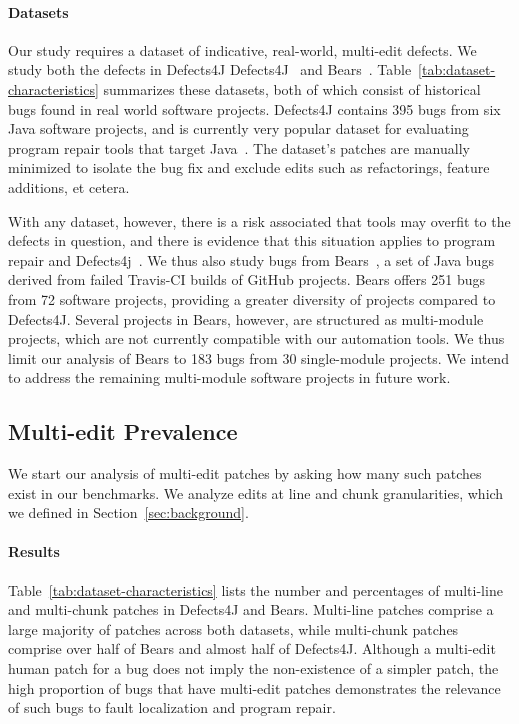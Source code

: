 \documentclass[sigconf, timestamp-false, anonymous=true]{acmart}
\begin{document}
\paragraph{Datasets}  Our study requires a dataset of indicative, real-world,
multi-edit defects.  We study both the defects in Defects4J
Defects4J~\cite{defects4j} and Bears~\cite{bears}.  Table~\ref{tab:dataset-characteristics}
summarizes these datasets, both of which
consist of historical
bugs found in real world software projects. Defects4J contains 395 bugs from 
six Java software projects, and is currently very popular dataset for evaluating 
program repair tools that target Java~\cite{durieux-repair-them-all}.
The dataset's patches are manually minimized to isolate the bug fix 
and exclude edits such as refactorings, feature additions, et cetera.

With any dataset, however, there is a risk associated that tools may overfit
to the defects in question, and there is evidence that this situation applies to
program repair and Defects4j~\cite{durieux-repair-them-all}. 
We thus also study bugs from Bears~\cite{bears}, 
a set of Java bugs derived from failed Travis-CI builds of GitHub projects. 
Bears offers 251 bugs from 72 software projects, providing a greater diversity of 
projects compared to Defects4J. 
Several projects in Bears, however, are structured as multi-module projects, 
which are not currently compatible with our automation tools.
We thus limit our analysis of Bears to 183 bugs from 30 single-module projects.
We intend to address the remaining multi-module software projects in future work.

\subsection{Multi-edit Prevalence}

We start our analysis of multi-edit patches by asking how many such patches 
exist in our benchmarks. We analyze edits at line and chunk granularities,
which we defined in Section~\ref{sec:background}.

\paragraph{Results} 
Table~\ref{tab:dataset-characteristics} lists the number and percentages of
multi-line and multi-chunk patches in Defects4J and Bears. 
Multi-line patches comprise a large majority of patches across both datasets, 
while multi-chunk patches comprise over half of Bears and almost half of Defects4J.
Although a multi-edit human patch for a bug does not imply the 
non-existence of a simpler patch, the high proportion of bugs that have 
multi-edit patches demonstrates the relevance of such bugs to fault localization and
program repair. 
\end{document}
